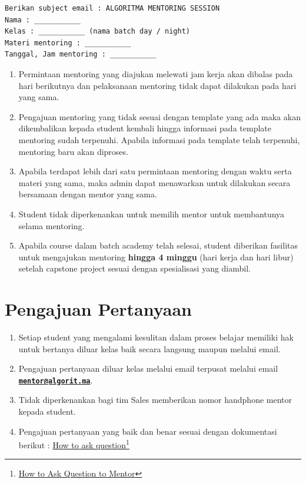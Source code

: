 \documentclass[
]{book}
\providecommand{\tightlist}{%
  \setlength{\itemsep}{0pt}\setlength{\parskip}{0pt}}
\begin{document}
\begin{verbatim}
Berikan subject email : ALGORITMA MENTORING SESSION
Nama : ___________
Kelas : ___________ (nama batch day / night)
Materi mentoring : ___________
Tanggal, Jam mentoring : ___________
\end{verbatim}

\begin{enumerate}
\def\labelenumi{\arabic{enumi}.}
\setcounter{enumi}{3}
\tightlist
\item
  Permintaan mentoring yang diajukan melewati jam kerja akan dibalas pada hari berikutnya dan pelaksanaan mentoring tidak dapat dilakukan pada hari yang sama.
\item
  Pengajuan mentoring yang tidak sesuai dengan template yang ada maka akan dikembalikan kepada student kembali hingga informasi pada template mentoring sudah terpenuhi. Apabila informasi pada template telah terpenuhi, mentoring baru akan diproses.
\item
  Apabila terdapat lebih dari satu permintaan mentoring dengan waktu serta materi yang sama, maka admin dapat menawarkan untuk dilakukan secara bersamaan dengan mentor yang sama.
\item
  Student tidak diperkenankan untuk memilih mentor untuk membantunya selama mentoring.
\item
  Apabila course dalam batch academy telah selesai, student diberikan fasilitas untuk mengajukan mentoring \textbf{hingga 4 minggu} (hari kerja dan hari libur) setelah capstone project sesuai dengan spesialisasi yang diambil.
\end{enumerate}

\hypertarget{pengajuan-pertanyaan}{%
\section{Pengajuan Pertanyaan}\label{pengajuan-pertanyaan}}

\begin{enumerate}
\def\labelenumi{\arabic{enumi}.}
\tightlist
\item
  Setiap student yang mengalami kesulitan dalam proses belajar memiliki hak untuk bertanya diluar kelas baik secara langsung maupun melalui email.
\item
  Pengajuan pertanyaan diluar kelas melalui email terpusat melalui email \textbf{\href{mailto:mentor@algorit.ma}{\nolinkurl{mentor@algorit.ma}}}.
\item
  Tidak diperkenankan bagi tim Sales memberikan nomor handphone mentor kepada student.
\item
  Pengajuan pertanyaan yang baik dan benar sesuai dengan dokumentasi berikut : \href{https://drive.google.com/file/d/1gWSTNF3wXK5Lbfssb-eT_A3gbnLvY_ez/view?usp=sharing}{How to ask question}\footnote{\href{https://drive.google.com/file/d/1gWSTNF3wXK5Lbfssb-eT_A3gbnLvY_ez/view?usp=sharing}{How to Ask Question to Mentor}}
\end{enumerate}
\end{document}
